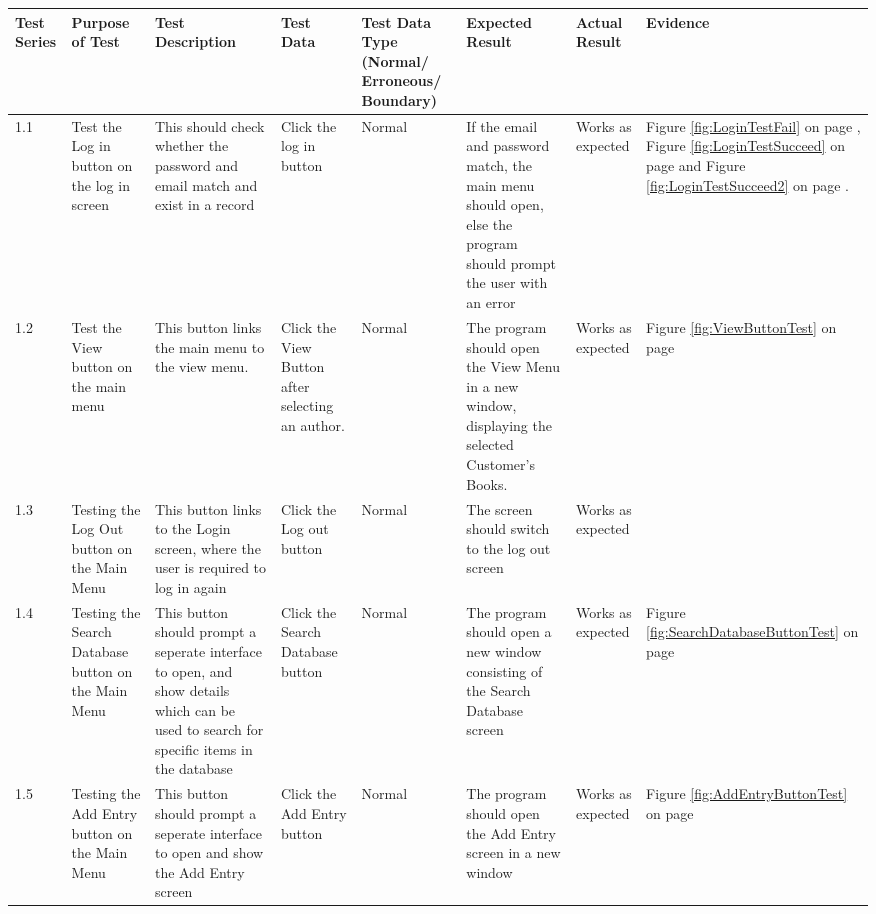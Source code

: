 \begin{landscape}
\begin{center}
    \begin{longtable}{|p{1.5cm}|p{2cm}|p{2.5cm}|p{2.5cm}|p{2cm}|p{2cm}|p{2cm}|p{2cm}|}
        \hline
        \textbf{Test Series} & \textbf{Purpose of Test} & \textbf{Test Description} & \textbf{Test Data} & \textbf{Test Data Type (Normal/ Erroneous/ Boundary)} & \textbf{Expected Result} & \textbf{Actual Result} & \textbf{Evidence}\\ \hline
        1.1 & Test the Log in button on the log in screen & This should check whether the password and email match and exist in a record & Click the log in button & Normal & If the email and password match, the main menu should open, else the program should prompt the user with an error & Works as expected & Figure \ref{fig:LoginTestFail} on page \pageref{fig:LoginTestFail}, Figure \ref{fig:LoginTestSucceed} on page \pageref{fig:LoginTestSucceed} and Figure \ref{fig:LoginTestSucceed2} on page \pageref{fig:LoginTestSucceed2} . \\ \hline
        1.2 & Test the View button on the main menu & This button links the main menu to the view menu. & Click the View Button after selecting an author. & Normal & The program should open the View Menu in a new window, displaying the selected Customer's Books. & Works as expected & Figure \ref{fig:ViewButtonTest} on page \pageref{fig:ViewButtonTest} \\ \hline
        1.3 & Testing the Log Out button on the Main Menu & This button links to the Login screen, where the user is required to log in again & Click the Log out button & Normal & The screen should switch to the log out screen & Works as expected & \\ \hline
        1.4 & Testing the Search Database button on the Main Menu & This button should prompt a seperate interface to open, and show details which can be used to search for specific items in the database & Click the Search Database button & Normal & The program should open a new window consisting of the Search Database screen & Works as expected & Figure \ref{fig:SearchDatabaseButtonTest} on page \pageref{fig:SearchDatabaseButtonTest} \\ \hline
        1.5 & Testing the Add Entry button on the Main Menu & This button should prompt a seperate interface to open and show the Add Entry screen & Click the Add Entry button & Normal & The program should open the Add Entry screen in a new window & Works as expected & Figure \ref{fig:AddEntryButtonTest} on page \pageref{fig:AddEntryButtonTest} \\ \hline

\end{longtable}
\end{center}
\end{landscape}
